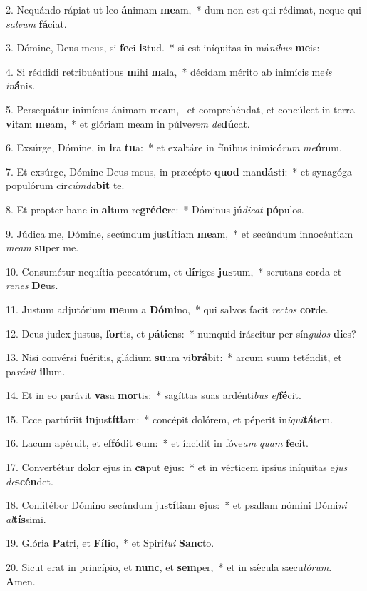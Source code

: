 2. Nequándo rápiat ut leo \textbf{á}nimam \textbf{me}am,~*  dum non est qui rédimat, neque qui \textit{sal}\textit{vum} \textbf{fá}ciat.\

3. Dómine, Deus meus, si \textbf{fe}ci \textbf{is}tud.~*  si est iníquitas in má\textit{ni}\textit{bus} \textbf{me}is:\

4. Si réddidi retribuéntibus \textbf{mi}hi \textbf{ma}la,~*  décidam mérito ab inimícis me\textit{is} \textit{in}\textbf{á}nis.\

5. Persequátur inimícus ánimam meam, \dag\  et comprehéndat, et concúlcet in terra \textbf{vi}tam \textbf{me}am,~*  et glóriam meam in púlve\textit{rem} \textit{de}\textbf{dú}cat.\

6. Exsúrge, Dómine, in \textbf{i}ra \textbf{tu}a:~*  et exaltáre in fínibus inimicó\textit{rum} \textit{me}\textbf{ó}rum.\

7. Et exsúrge, Dómine Deus meus, in præcépto \textbf{quod} man\textbf{dás}ti:~*  et synagóga populórum cir\textit{cúm}\textit{da}\textbf{bit} te.\

8. Et propter hanc in \textbf{al}tum re\textbf{gré}\textbf{de}re:~*  Dóminus jú\textit{di}\textit{cat} \textbf{pó}pulos.\

9. Júdica me, Dómine, secúndum jus\textbf{tí}tiam \textbf{me}am,~*  et secúndum innocéntiam \textit{me}\textit{am} \textbf{su}per me.\

10. Consumétur nequítia peccatórum, et \textbf{dí}riges \textbf{jus}tum,~*  scrutans corda et \textit{re}\textit{nes} \textbf{De}us.\

11. Justum adjutórium \textbf{me}um a \textbf{Dó}\textbf{mi}no,~*  qui salvos facit \textit{rec}\textit{tos} \textbf{cor}de.\

12. Deus judex justus, \textbf{for}tis, et \textbf{pá}\textbf{ti}ens:~*  numquid iráscitur per sín\textit{gu}\textit{los} \textbf{di}es?\

13. Nisi convérsi fuéritis, gládium \textbf{su}um vi\textbf{brá}bit:~*  arcum suum teténdit, et pa\textit{rá}\textit{vit} \textbf{il}lum.\

14. Et in eo parávit \textbf{va}sa \textbf{mor}tis:~*  sagíttas suas ardénti\textit{bus} \textit{ef}\textbf{fé}cit.\

15. Ecce partúriit \textbf{in}jus\textbf{tí}\textbf{ti}am:~*  concépit dolórem, et péperit in\textit{i}\textit{qui}\textbf{tá}tem.\

16. Lacum apéruit, et ef\textbf{fó}dit \textbf{e}um:~*  et íncidit in fóve\textit{am} \textit{quam} \textbf{fe}cit.\

17. Convertétur dolor ejus in \textbf{ca}put \textbf{e}jus:~*  et in vérticem ipsíus iníquitas e\textit{jus} \textit{de}\textbf{scén}det.\

18. Confitébor Dómino secúndum jus\textbf{tí}tiam \textbf{e}jus:~*  et psallam nómini Dómi\textit{ni} \textit{al}\textbf{tís}simi.\

19. Glória \textbf{Pa}tri, et \textbf{Fí}\textbf{li}o,~*  et Spirí\textit{tu}\textit{i} \textbf{Sanc}to.\

20. Sicut erat in princípio, et \textbf{nunc}, et \textbf{sem}per,~*  et in sǽcula sæcu\textit{ló}\textit{rum}. \textbf{A}men.\

